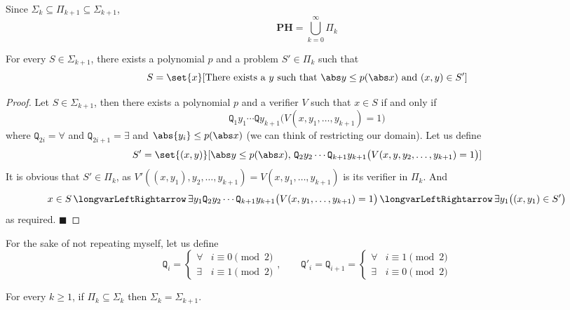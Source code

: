 \documentclass[10pt]{article}
\def\iff{\,\longvarLeftRightarrow\,}
\def\quant{\mathtt{Q}}
\def\PH{\mathbf{PH}}
\def\qed{%
    \ifmmode%
        \eqno\blacksquare%
    \else%
        \hskip1cm\allowbreak\hbox{}\nobreak\hfill$\blacksquare$%
    \fi%
}
\begin{document}
Since $\Sigma_k\subseteq\Pi_{k+1}\subseteq\Sigma_{k+1}$,
\[ \PH = \bigcup_{k=0}^\infty \Pi_k \]

\begin{lemm*}

    For every $S\in\Sigma_{k+1}$, there exists a polynomial $p$ and a problem $S'\in\Pi_k$ such that
    \[ S = \set{x}[\text{There exists a $y$ such that $\abs y\leq p(\abs x)$ and $(x,y)\in S'$}] \]

\end{lemm*}

\begin{proof}

    Let $S\in\Sigma_{k+1}$, then there exists a polynomial $p$ and a verifier $V$ such that $x\in S$ if and only if
    \[ \quant_1 y_1\cdots\quant y_{k+1}\bigl(V(x,y_1,\dots,y_{k+1})=1\bigr) \]
    where $\quant_{2i}=\forall$ and $\quant_{2i+1}=\exists$ and $\abs{y_i}\leq p(\abs x)$ (we can think of restricting our domain).
    Let us define
    \[ S' = \set{(x,y)}[\abs y\leq p(\abs x),\,\quant_2 y_2\cdots\quant_{k+1} y_{k+1}\bigl(V(x,y,y_2,\dots,y_{k+1})=1\bigr)] \]
    It is obvious that $S'\in\Pi_k$, as $V'((x,y_1),y_2,\dots,y_{k+1})=V(x,y_1,\dots,y_{k+1})$ is its verifier in $\Pi_k$.
    And
    \[ x\in S\iff \exists y_1\quant_2y_2\cdots\quant_{k+1}y_{k+1}\bigl(V(x,y_1,\dots,y_{k+1})=1\bigr) \iff \exists y_1\bigl((x,y_1)\in S'\bigr) \]
    as required.
    \qed

\end{proof}

For the sake of not repeating myself, let us define
\[ \quant_i = \begin{cases} \forall & i\equiv0\pmod2 \\ \exists & i\equiv1\pmod2 \end{cases},\qquad
\quant'_i = \quant_{i+1} = \begin{cases} \forall & i\equiv1\pmod2 \\ \exists & i\equiv0\pmod2 \end{cases} \]

\begin{lemm*}

    For every $k\geq1$, if $\Pi_k\subseteq\Sigma_k$ then $\Sigma_k=\Sigma_{k+1}$.

\end{lemm*}
\end{document}
